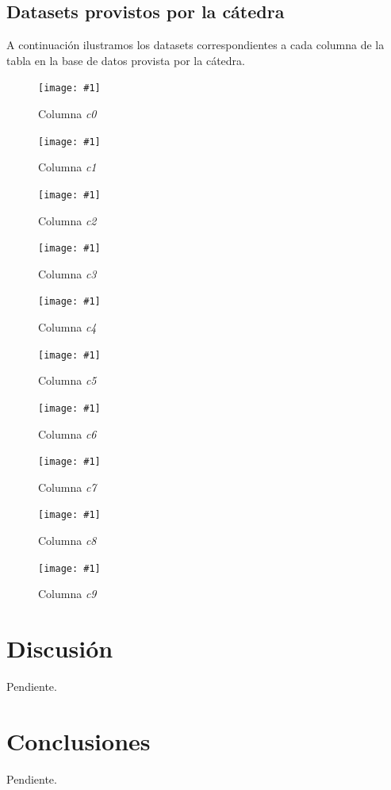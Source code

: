 \documentclass[a4paper, 10pt, twoside]{article}
\newcommand{\grafico}[3]{
  \begin{figure}[H]
    \texttt{[image: \#1]}
    \caption{#2}
    \label{#3}
  \end{figure}
}
\begin{document}
\subsection{Datasets provistos por la cátedra}

A continuación ilustramos los datasets correspondientes a cada columna de la tabla en la base de datos provista por la cátedra.

\grafico{dataset-c0}
        {Columna \emph{c0}}
        {dataset-columna-c0}

\grafico{dataset-c1}
        {Columna \emph{c1}}
        {dataset-columna-c1}

\grafico{dataset-c2}
        {Columna \emph{c2}}
        {dataset-columna-c2}

\grafico{dataset-c3}
        {Columna \emph{c3}}
        {dataset-columna-c3}

\grafico{dataset-c4}
        {Columna \emph{c4}}
        {dataset-columna-c4}

\grafico{dataset-c5}
        {Columna \emph{c5}}
        {dataset-columna-c5}

\grafico{dataset-c6}
        {Columna \emph{c6}}
        {dataset-columna-c6}

\grafico{dataset-c7}
        {Columna \emph{c7}}
        {dataset-columna-c7}

\grafico{dataset-c8}
        {Columna \emph{c8}}
        {dataset-columna-c8}

\grafico{dataset-c9}
        {Columna \emph{c9}}
        {dataset-columna-c9}




\section{Discusión}

Pendiente.




\section{Conclusiones}

Pendiente.
\end{document}
